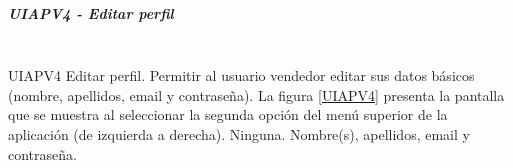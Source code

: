 \subparagraph{UIAPV4 - Editar perfil} ~\\

{UIAPV4} %
{Editar perfil.}  %
{Permitir al usuario vendedor editar sus datos básicos (nombre, apellidos, email y contraseña). } %
{La figura \ref{UIAPV4} presenta la pantalla que se muestra al seleccionar la segunda opción del menú superior de la aplicación (de izquierda a derecha).} %
{Ninguna.} %
{Nombre(s), apellidos, email y contraseña.} %


